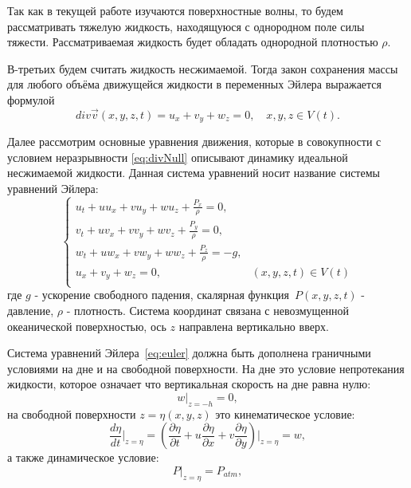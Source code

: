 Так как в текущей работе изучаются поверхностные волны, то будем рассматривать тяжелую жидкость, находящуюся с однородном поле силы тяжести. Рассматриваемая жидкость будет обладать однородной плотностью $\rho$.

В-третьих будем считать жидкость несжимаемой. Тогда закон сохранения массы для любого объёма движущейся жидкости в переменных Эйлера выражается формулой
\begin{equation}\label{eq:divNull}
div\overrightarrow v(x,y,z,t)=u_x+v_y+w_z=0,\quad
x,y,z\in V(t).
\end{equation}

Далее рассмотрим основные уравнения движения, которые в совокупности с условием неразрывности \eqref{eq:divNull} описывают динамику идеальной несжимаемой жидкости. Данная система уравнений носит название системы уравнений Эйлера:
\begin{equation}\label{eq:euler}
\begin{cases}
u_t + uu_x + vu_y + wu_z + \frac{P_x}{\rho} = 0, & \\
v_t + uv_x + vv_y + wv_z + \frac{P_y}{\rho} = 0, & \\
w_t + uw_x + vw_y + ww_z + \frac{P_z}{\rho} = -g, & \\
u_x+v_y+w_z=0, & (x,y,z,t)\in V(t)  \\
\end{cases}
\end{equation}
где $g$ - ускорение свободного падения, скалярная функ\-ция~$P(x,y,z,t)$ - давление, $\rho$ - плотность.
Система координат связана с невозмущенной океанической
поверхностью, ось $z$ направлена вертикально вверх.

Система уравнений Эйлера~\eqref{eq:euler} должна быть дополнена граничными условиями на дне и на свободной поверхности. На дне это условие непротекания жидкости, которое означает что вертикальная скорость на дне равна нулю:
\begin{equation}\label{eq:granUslBottom}
  w{|_{z=-h}}=0,
\end{equation}
на свободной поверхности $z=\eta(x,y,z)$ это кинематическое условие:
\begin{equation}\label{eq:kinematGranUsl}
  {\frac{d\eta}{dt}}{|_{z=\eta}}={(\frac{\partial\eta}{\partial t}+u\frac{\partial\eta}{\partial x}+v\frac{\partial\eta}{\partial y})}|_{z=\eta}=w,
\end{equation}
а также динамическое условие:
\begin{equation}\label{eq:dynGranUsl}
  {P}|_{z=\eta}=P_{atm},
\end{equation}

